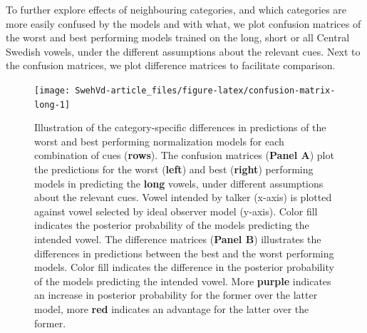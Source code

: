 \documentclass[utf8]{frontiersSCNS}
\begin{document}
To further explore effects of neighbouring categories, and which categories are more easily confused by the models and with what, we plot confusion matrices of the worst and best performing models trained on the long, short or all Central Swedish vowels, under the different assumptions about the relevant cues. Next to the confusion matrices, we plot difference matrices to facilitate comparison.



\begin{landscape}

\begin{figure}

{\centering \texttt{[image: SwehVd-article\_files/figure-latex/confusion-matrix-long-1]} 

}

\caption{Illustration of the category-specific differences in predictions of the worst and best performing normalization models for each combination of cues (\textbf{rows}). The confusion matrices (\textbf{Panel A}) plot the predictions for the worst (\textbf{left}) and best (\textbf{right}) performing models in predicting the \textbf{long} vowels, under different assumptions about the relevant cues. Vowel intended by talker (x-axis) is plotted against vowel selected by ideal observer model (y-axis). Color fill indicates the posterior probability of the models predicting the intended vowel. The difference matrices (\textbf{Panel B}) illustrates the differences in predictions between the best and the worst performing models. Color fill indicates the difference in the posterior probability of the models predicting the intended vowel. More \textbf{purple} indicates an increase in posterior probability for the former over the latter model, more \textbf{red} indicates an advantage for the latter over the former.}\label{fig:confusion-matrix-long}
\end{figure}
\end{landscape}
\end{document}
